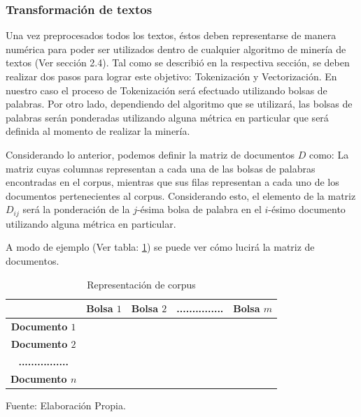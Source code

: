 
\subsubsection{Transformación de textos}
    Una vez preprocesados todos los textos, éstos deben representarse de manera numérica para poder ser utilizados dentro de cualquier algoritmo de minería de textos (Ver sección 2.4). Tal como se describió en la respectiva sección, se deben realizar dos pasos para lograr este objetivo: Tokenización y Vectorización. En nuestro caso el proceso de Tokenización será efectuado utilizando bolsas de palabras. Por otro lado, dependiendo del algoritmo que se utilizará, las bolsas de palabras serán ponderadas utilizando alguna métrica en particular que será definida al momento de realizar la minería. 
    
    Considerando lo anterior, podemos definir la matriz de documentos $D$ como: La matriz cuyas columnas representan a cada una de las bolsas de palabras encontradas en el corpus, mientras que sus filas representan a cada uno de los documentos pertenecientes al corpus. Considerando esto, el elemento de la matriz $D_{ij}$ será la ponderación de la $j$-ésima bolsa de palabra en el $i$-ésimo documento utilizando alguna métrica en particular.
    
    A modo de ejemplo (Ver tabla: \ref{table:matriz de datos}) se puede ver cómo lucirá la matriz de documentos.
    
    \begin{table}[H]
    \centering
    \begin{tabular}{c|c|c|l|l|}
    \cline{2-5}
    \textbf{}                                       & \textbf{Bolsa $1$} & \textbf{Bolsa $2$} & \textbf{...............} & \textbf{Bolsa $m$} \\ \hline
    \multicolumn{1}{|c|}{\textbf{Documento $1$}}    &                  &                  &                          &                  \\ \hline
    \multicolumn{1}{|c|}{\textbf{Documento $2$}}    &                  &                  &                          &                  \\ \hline
    \multicolumn{1}{|c|}{\textbf{................}} &                  &                  &                          &                  \\ \hline
    \multicolumn{1}{|c|}{\textbf{Documento $n$}}    &                  &                  &                          &                  \\ \hline
    \end{tabular}
     \caption{\label{table:matriz de datos} Representación de corpus} Fuente: Elaboración Propia.
    \end{table}
    
